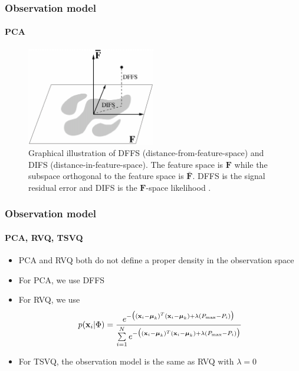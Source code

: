 \begin{frame}
\frametitle{Observation model}
\framesubtitle{PCA}
\logoCSIPCPL\mypagenum
\begin{figure}[t]
\centering
\includegraphics[width=0.5\textwidth]{thesis/1998_JNL_ProbVisLearning_Moghaddam_fig3.png}
\caption{Graphical illustration of DFFS (distance-from-feature-space) and DIFS (distance-in-feature-space).  The feature space is $\mathbf{F}$ while the subspace orthogonal to the feature space is $\bar{\mathbf{F}}$.  DFFS is the signal residual error and DIFS is the $\mathbf{F}$-space likelihood \cite{1997_JNL_EigenTRK_Moghaddam}.}
\label{fig:1997_JNL_DIFSDFFS_Moghaddam}
\end{figure}
\end{frame}


\begin{frame}
\frametitle{Observation model}
\framesubtitle{PCA, RVQ, TSVQ}
\logoCSIPCPL\mypagenum
\begin{itemize}
\item PCA and RVQ both do not define a proper density in the observation space
\item For PCA, we use DFFS
\item For RVQ, we use
\begin{equation}
p(\mathbf{x}_i|\Phi) = \frac{e^{-\big((\mathbf{x}_i-\boldsymbol\mu_k)^T(\mathbf{x}_i-\boldsymbol\mu_k) + \lambda({P_{\textrm{max}}-P_i})\big)}} {\sum\limits_{i=1}^N e^{-\big((\mathbf{x}_i-\boldsymbol\mu_k)^T(\mathbf{x}_i-\boldsymbol\mu_k) + \lambda({P_{\textrm{max}}-P_i})\big)}}
\end{equation}
\item For TSVQ, the observation model is the same as RVQ with $\lambda=0$
\end{itemize}
\end{frame}


